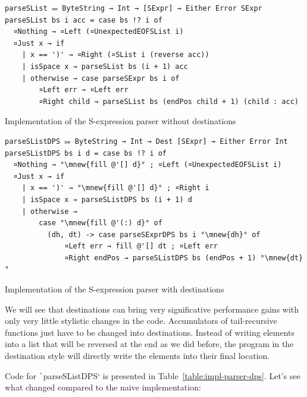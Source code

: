 \documentclass[english]{jflart}
\newcommand{\mnew}[1]{\colorbox{green!50}{#1}}
\begin{document}
\begin{table}[t]
\small
\begin{verbatim}
parseSList ⩴ ByteString → Int → [SExpr] → Either Error SExpr
parseSList bs i acc = case bs !? i of
  ¤Nothing → ¤Left (¤UnexpectedEOFSList i)
  ¤Just x → if
    | x == ')' → ¤Right (¤SList i (reverse acc))
    | isSpace x → parseSList bs (i + 1) acc
    | otherwise → case parseSExpr bs i of
        ¤Left err → ¤Left err
        ¤Right child → parseSList bs (endPos child + 1) (child : acc)
\end{verbatim}
\caption{Implementation of the S-expression parser without destinations}
\label{table:impl-parser-naive}

\bigskip

\small
\begin{verbatim}
parseSListDPS ⩴ ByteString → Int → Dest [SExpr] ⊸ Either Error Int
parseSListDPS bs i d = case bs !? i of
  ¤Nothing → °\mnew{fill @'[] d}° ; ¤Left (¤UnexpectedEOFSList i)
  ¤Just x → if
    | x == ')' → °\mnew{fill @'[] d}° ; ¤Right i
    | isSpace x → parseSListDPS bs (i + 1) d
    | otherwise →
        case °\mnew{fill @'(:) d}° of
          (dh, dt) -> case parseSExprDPS bs i °\mnew{dh}° of
              ¤Left err → fill @'[] dt ; ¤Left err
              ¤Right endPos → parseSListDPS bs (endPos + 1) °\mnew{dt}°
\end{verbatim}
\caption{Implementation of the S-expression parser with destinations}
\label{table:impl-parser-dps}
\end{table}

We will see that destinations can bring very significative performance gains with only very little stylistic changes in the code. Accumulators of tail-recursive functions just have to be changed into destinations. Instead of writing elements into a list that will be reversed at the end as we did before, the program in the destination style will directly write the elements into their final location.

Code for \texttt`parseSListDPS` is presented in Table~\ref{table:impl-parser-dps}. Let's see what changed compared to the naive implementation:
\end{document}
